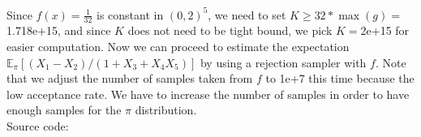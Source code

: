 Since $f(x)=\frac{1}{32}$ is constant in $(0,2)^5$, we need to set $K\ge 32*\max(g)=$1.718e+15, and since $K$ does not need to be tight bound, we pick $K=$2e+15 for easier computation. Now we can proceed to estimate the expectation $\mathbb{E}_\pi[(X_1-X_2)/(1+X_3+X_4X_5)]$ by using a rejection sampler with $f$. Note that we adjust the number of samples taken from $f$ to 1e+7 this time because the low acceptance rate. We have to increase the number of samples in order to have enough samples for the $\pi$ distribution.\\
Source code:
\begin{knitrout}
\color{fgcolor}\begin{kframe}
\begin{alltt}

 \hlkwb{=}  \hlkwb{=}  \hlkwb{=}  \hlkwb{=} 

 \hlkwb{=} \hlstd{(}\hlstd{,}\hlstd{,}\hlstd{,}\hlstd{,}\hlopt{-}\hlopt{/}\hlstd{(}\hlopt{+}\hlopt{+}\hlopt{*}
 \hlkwb{=} \hlstd{(}\hlstd{,}\hlstd{,}\hlstd{,}\hlstd{,}\hlstd{)}
\hlopt{+}\hlopt{+}\hlstd{)}\hlopt{^}\hlopt{+}\hlstd{)}\hlopt{*}\hlstd{(}\hlopt{+}\hlopt{+}\hlstd{)}\hlopt{*}\hlopt{*}\hlstd{(}\hlstd{((}\hlopt{-}\hlopt{*}\hlopt{*}\hlopt{-}\hlopt{*}\hlopt{^}\hlopt{+}\hlstd{)\}}
 \hlkwb{=} 

 \hlkwb{=} 

 \hlkwb{=} \hlstd{,}\hlstd{)}
 \hlkwb{=} \hlstd{,}\hlstd{)}
 \hlkwb{=} \hlstd{,}\hlstd{)}
 \hlkwb{=} \hlstd{,}\hlstd{)}
 \hlkwb{=} \hlstd{,}\hlstd{)}

 \hlkwb{=} 
 \hlkwb{=} \hlopt{<=}\hlopt{*}\hlopt{/}


\end{alltt}
\end{kframe}
\end{knitrout}
